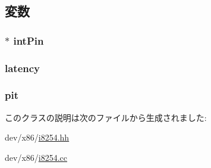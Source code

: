 \subsection{変数}
\hypertarget{classX86ISA_1_1I8254_abc04d372f6b8e69a72f4c25db91ede99}{
\subsubsection[{intPin}]{$\ast$ {\bf intPin}}}
\label{classX86ISA_1_1I8254_abc04d372f6b8e69a72f4c25db91ede99}
\hypertarget{classX86ISA_1_1I8254_ac8d8966078cc047949fd1bca8feb21b6}{
\subsubsection[{latency}]{ {\bf latency}}}
\label{classX86ISA_1_1I8254_ac8d8966078cc047949fd1bca8feb21b6}
\hypertarget{classX86ISA_1_1I8254_a5559b5258c033557490373c27bd673cc}{
\subsubsection[{pit}]{ {\bf pit}}}
\label{classX86ISA_1_1I8254_a5559b5258c033557490373c27bd673cc}


このクラスの説明は次のファイルから生成されました:\begin{DoxyCompactItemize}
\item 
dev/x86/\hyperlink{i8254_8hh}{i8254.hh}\item 
dev/x86/\hyperlink{i8254_8cc}{i8254.cc}\end{DoxyCompactItemize}
